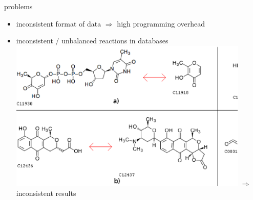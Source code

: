 \documentclass[style=aggie]{powerdot}
\newcommand{\magic}{transmutational} %
\newcommand{\indistinct}{indistinct}
\begin{document}
\begin{slide}{problems}
\begin{itemize}
  \item inconsistent format of data $\Rightarrow$ high programming overhead\newline
  \item inconsistent / unbalanced reactions in databases\newline \\
  \includegraphics[width=0.9\textwidth]{examples.ps}
  $\Rightarrow$ inconsistent results
\end{itemize}
\end{slide}
\newcommand{\fordataset}{\foreach \Num/\description/\color/\pattern in {
	\the\lastbalanced / balanced		/green/north east lines,
	 \the\lastindistinctive / \indistinct /yellow/north west lines,
	\the\lastunbalanced / unbalanced without \magic	/orange/dots,
	 \the\lastmagic / \magic		/red/vertical lines}
}
\end{document}
